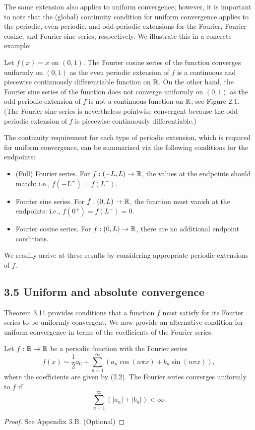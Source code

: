 The same extension also applies to uniform convergence; however, it is important to note that the (global) continuity condition for uniform convergence applies to the periodic, even-periodic, and odd-periodic extensions for the Fourier, Fourier cosine, and Fourier sine series, respectively. We illustrate this in a concrete example:

\begin{example}
    Let $f(x) = x$ on $(0, 1)$. The Fourier cosine series of the function converges uniformly on $(0, 1)$ as the even periodic extension of $f$ is a continuous and piecewise continuously differentiable function on $\mathbb{R}$. On the other hand, the Fourier sine series of the function does not converge uniformly on $(0, 1)$ as the odd periodic extension of $f$ is not a continuous function on $\mathbb{R}$; see Figure 2.1. (The Fourier sine series is nevertheless pointwise convergent because the odd periodic extension of $f$ is piecewise continuously differentiable.)
\end{example}

The continuity requirement for each type of periodic extension, which is required for uniform convergence, can be summarized via the following conditions for the endpoints:
\begin{itemize}
    \item (Full) Fourier series. For $f : (-L, L) \to \mathbb{R}$, the values at the endpoints should match: i.e., $f(-L^+) = f(L^-)$.
    \item Fourier sine series. For $f : (0, L) \to \mathbb{R}$, the function must vanish at the endpoints: i.e., $f(0^+) = f(L^-) = 0$.
    \item Fourier cosine series. For $f : (0, L) \to \mathbb{R}$, there are no additional endpoint conditions.
\end{itemize}
We readily arrive at these results by considering appropriate periodic extensions of $f$.

\subsection{3.5 Uniform and absolute convergence}
Theorem 3.11 provides conditions that a function $f$ must satisfy for its Fourier series to be uniformly convergent. We now provide an alternative condition for uniform convergence in terms of the coefficients of the Fourier series.

\begin{theorem}
    Let $f : \mathbb{R} \to \mathbb{R}$ be a periodic function with the Fourier series
    \[f(x) \sim \frac{1}{2} a_0 + \sum_{n=1}^{\infty} \left(a_n \cos(n\pi x) + b_n \sin(n\pi x)\right),\]
    where the coefficients are given by (2.2). The Fourier series converges uniformly to $f$ if
    \[\sum_{n=1}^{\infty} (|a_n| + |b_n|) < \infty.\]
\end{theorem}
\begin{proof}
    See Appendix 3.B. (Optional)
\end{proof}

